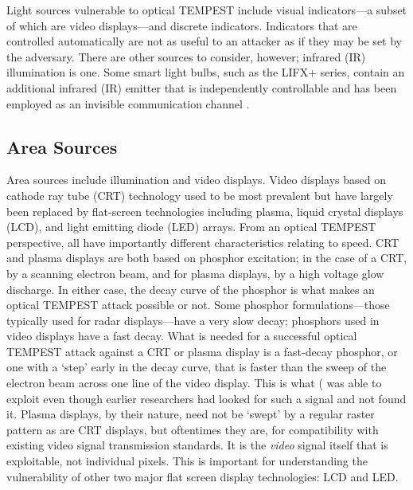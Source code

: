 \documentclass[a4paper,twoside,11pt,openany]{book}
\begin{document}
Light sources vulnerable to optical TEMPEST include visual indicators---a
subset of which are video displays---and discrete indicators. Indicators that
are controlled automatically are not as useful to an attacker as if they may be
set by the adversary. There are other sources to consider, however; infrared
(IR) illumination is one. Some smart light bulbs, such as the LIFX+ series,
contain an additional infrared (IR) emitter that is independently controllable
and has been employed as an invisible communication channel \cite{Maiti2018b}.

\subsection{Area Sources}\label{section:Markus}

Area sources include illumination and video displays. Video displays based on
cathode ray tube (CRT) technology used to be most prevalent but have largely
been replaced by flat-screen technologies including plasma, liquid crystal
displays (LCD), and light emitting diode (LED) arrays. From an optical TEMPEST
perspective, all have importantly different characteristics relating to speed.
CRT and plasma displays are both based on phosphor excitation; in the case of a
CRT, by a scanning electron beam, and for plasma displays, by a high voltage
glow discharge. In either case, the decay curve of the phosphor is what makes
an optical TEMPEST attack possible or not. Some phosphor formulations---those
typically used for radar displays---have a very slow decay; phosphors used in
video displays have a fast decay. What is needed for a successful optical
TEMPEST attack against a CRT or plasma display is a fast-decay phosphor, or one
with a `step' early in the decay curve, that is faster than the sweep of the
electron beam across one line of the video display. This is what
\citeauthor{Kuhn2002} (\citeyear{Kuhn2002} was able to exploit even though
earlier researchers had looked for such a signal and not found it. Plasma
displays, by their nature, need not be `swept' by a regular raster pattern as
are CRT displays, but oftentimes they are, for compatibility with existing
video signal transmission standards. It is the \emph{video} signal itself that
is exploitable, not individual pixels. This is important for understanding the
vulnerability of other two major flat screen display technologies: LCD and LED.
\end{document}
